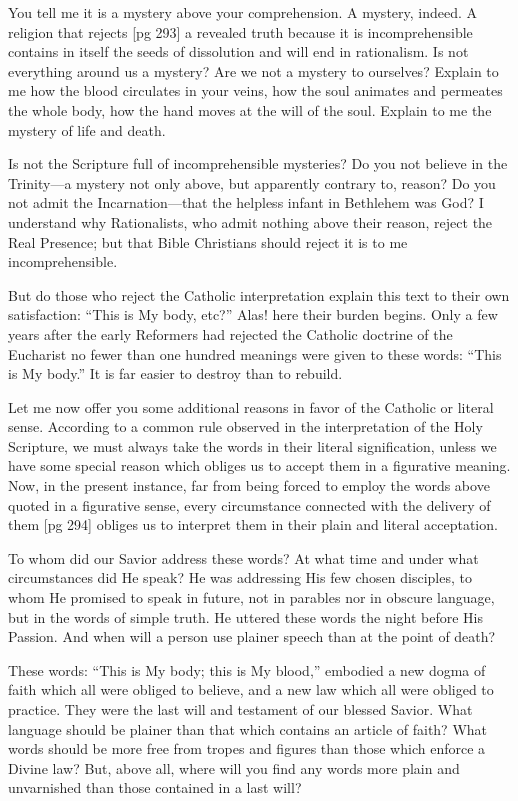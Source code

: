You tell me it is a mystery above your comprehension.
A mystery, indeed. A religion that rejects
[pg 293]
a revealed truth because it is incomprehensible
contains in itself the seeds of dissolution and
will end in rationalism. Is not everything around
us a mystery? Are we not a mystery to ourselves?
Explain to me how the blood circulates in your
veins, how the soul animates and permeates the
whole body, how the hand moves at the will of the
soul. Explain to me the mystery of life and
death.

Is not the Scripture full of incomprehensible
mysteries? Do you not believe in the Trinity—a
mystery not only above, but apparently contrary
to, reason? Do you not admit the Incarnation—that
the helpless infant in Bethlehem was God? I
understand why Rationalists, who admit nothing
above their reason, reject the Real Presence; but
that Bible Christians should reject it is to me incomprehensible.

But do those who reject the Catholic interpretation
explain this text to their own satisfaction:
“This is My body, etc?” Alas! here their burden
begins. Only a few years after the early Reformers
had rejected the Catholic doctrine of the
Eucharist no fewer than one hundred meanings
were given to these words: “This is My body.”
It is far easier to destroy than to rebuild.

Let me now offer you some additional reasons
in favor of the Catholic or literal sense. According
to a common rule observed in the interpretation
of the Holy Scripture, we must always take
the words in their literal signification, unless we
have some special reason which obliges us to accept
them in a figurative meaning. Now, in the
present instance, far from being forced to employ
the words above quoted in a figurative sense, every
circumstance connected with the delivery of them
[pg 294]
obliges us to interpret them in their plain and
literal acceptation.

To whom did our Savior address these words?
At what time and under what circumstances did
He speak? He was addressing His few chosen disciples,
to whom He promised to speak in future,
not in parables nor in obscure language, but
in the words of simple truth. He uttered these
words the night before His Passion. And when
will a person use plainer speech than at the point
of death?

These words: “This is My body; this is My
blood,” embodied a new dogma of faith which all
were obliged to believe, and a new law which all
were obliged to practice. They were the last will
and testament of our blessed Savior. What language
should be plainer than that which contains
an article of faith? What words should be more
free from tropes and figures than those which enforce
a Divine law? But, above all, where will you
find any words more plain and unvarnished than
those contained in a last will?

